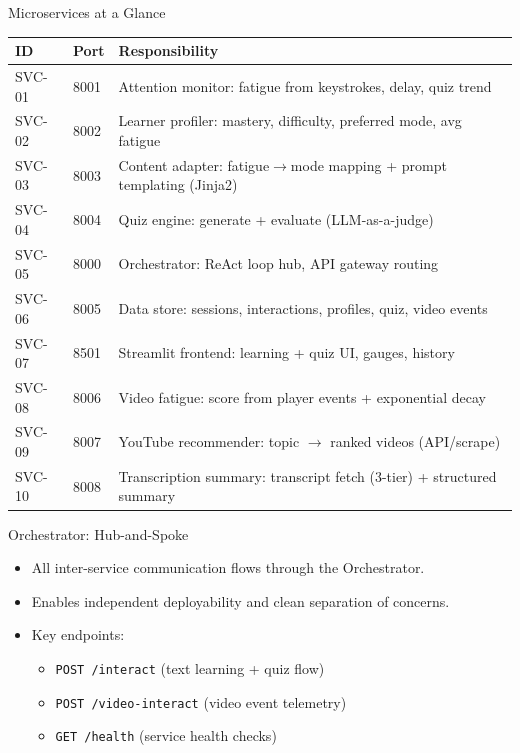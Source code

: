 \documentclass{sdqbeamer}
\begin{document}
\begin{frame}{Microservices at a Glance}
\small
\begin{tabularx}{\textwidth}{@{}l l X@{}}
\toprule
\textbf{ID} & \textbf{Port} & \textbf{Responsibility}\\
\midrule
SVC-01 & 8001 & Attention monitor: fatigue from keystrokes, delay, quiz trend\\
SVC-02 & 8002 & Learner profiler: mastery, difficulty, preferred mode, avg fatigue\\
SVC-03 & 8003 & Content adapter: fatigue$\rightarrow$mode mapping + prompt templating (Jinja2)\\
SVC-04 & 8004 & Quiz engine: generate + evaluate (LLM-as-a-judge)\\
SVC-05 & 8000 & Orchestrator: ReAct loop hub, API gateway routing\\
SVC-06 & 8005 & Data store: sessions, interactions, profiles, quiz, video events\\
SVC-07 & 8501 & Streamlit frontend: learning + quiz UI, gauges, history\\
SVC-08 & 8006 & Video fatigue: score from player events + exponential decay\\
SVC-09 & 8007 & YouTube recommender: topic $\rightarrow$ ranked videos (API/scrape)\\
SVC-10 & 8008 & Transcription summary: transcript fetch (3-tier) + structured summary\\
\bottomrule
\end{tabularx}
\end{frame}

\begin{frame}{Orchestrator: Hub-and-Spoke}
\begin{itemize}
  \item All inter-service communication flows through the Orchestrator.
  \item Enables independent deployability and clean separation of concerns.
  \item Key endpoints:
  \begin{itemize}
    \item \texttt{POST /interact} (text learning + quiz flow)
    \item \texttt{POST /video-interact} (video event telemetry)
    \item \texttt{GET /health} (service health checks)
  \end{itemize}
\end{itemize}
\end{frame}
\end{document}
